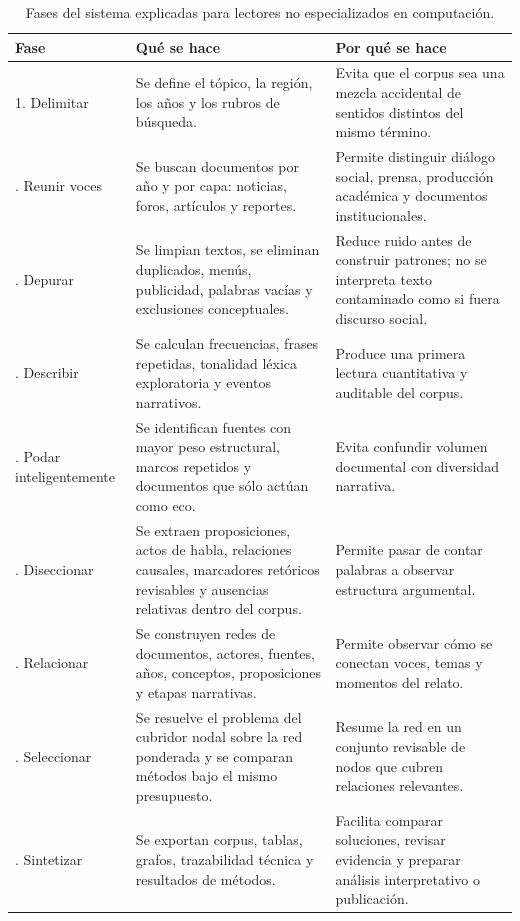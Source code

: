 \documentclass[11pt]{article}
\begin{document}
\begin{table}[ht]
\centering
\small
\begin{tabular}{p{}p{}p{}}
\toprule
\textbf{Fase} & \textbf{Qué se hace} & \textbf{Por qué se hace} \\
\midrule
1. Delimitar & Se define el tópico, la región, los años y los rubros de búsqueda. &
Evita que el corpus sea una mezcla accidental de sentidos distintos del mismo término. \\
\addlinespace
2. Reunir voces & Se buscan documentos por año y por capa: noticias, foros,
artículos y reportes. & Permite distinguir diálogo social, prensa, producción
académica y documentos institucionales. \\
\addlinespace
3. Depurar & Se limpian textos, se eliminan duplicados, menús, publicidad,
palabras vacías y exclusiones conceptuales. & Reduce ruido antes de construir
patrones; no se interpreta texto contaminado como si fuera discurso social. \\
\addlinespace
4. Describir & Se calculan frecuencias, frases repetidas, tonalidad léxica
exploratoria y eventos narrativos. & Produce una primera lectura cuantitativa y
auditable del corpus. \\
\addlinespace
5. Podar inteligentemente & Se identifican fuentes con mayor peso estructural,
marcos repetidos y documentos que sólo actúan como eco. & Evita confundir
volumen documental con diversidad narrativa. \\
\addlinespace
6. Diseccionar & Se extraen proposiciones, actos de habla, relaciones causales,
marcadores retóricos revisables y ausencias relativas dentro del corpus. & Permite
pasar de contar palabras a observar estructura argumental. \\
\addlinespace
7. Relacionar & Se construyen redes de documentos, actores, fuentes, años,
conceptos, proposiciones y etapas narrativas. & Permite observar cómo se
conectan voces, temas y momentos del relato. \\
\addlinespace
8. Seleccionar & Se resuelve el problema del cubridor nodal sobre la red
ponderada y se comparan métodos bajo el mismo presupuesto. & Resume la red en
un conjunto revisable de nodos que cubren relaciones relevantes. \\
\addlinespace
9. Sintetizar & Se exportan corpus, tablas, grafos, trazabilidad técnica y
resultados de métodos. & Facilita comparar soluciones, revisar evidencia y
preparar análisis interpretativo o publicación. \\
\bottomrule
\end{tabular}
\caption{Fases del sistema explicadas para lectores no especializados en computación.}
\label{fig:tabla-fases}
\end{table}
\end{document}
